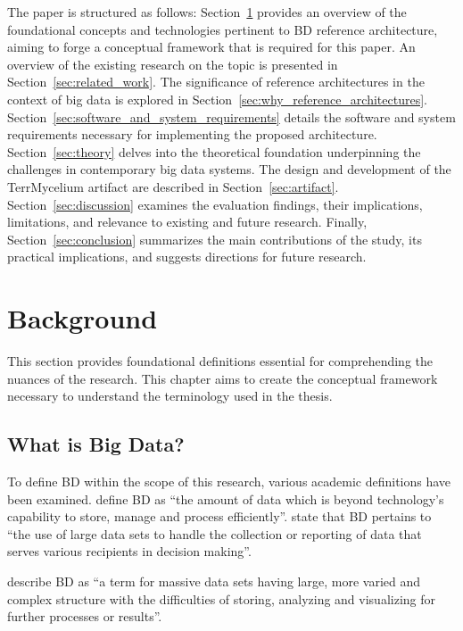 \documentclass[preprint,12pt]{elsarticle}
\begin{document}
The paper is structured as follows: Section~\ref{sec:background} provides an overview of the foundational concepts and technologies pertinent to BD reference architecture, aiming to forge a conceptual framework that is required for this paper. An overview of the existing research on the topic is presented in Section~\ref{sec:related_work}. The significance of reference architectures in the context of big data is explored in Section~\ref{sec:why_reference_architectures}. Section~\ref{sec:software_and_system_requirements} details the software and system requirements necessary for implementing the proposed architecture. Section~\ref{sec:theory} delves into the theoretical foundation underpinning the challenges in contemporary big data systems. The design and development of the TerrMycelium artifact are described in Section~\ref{sec:artifact}. Section~\ref{sec:discussion} examines the evaluation findings, their implications, limitations, and relevance to existing and future research. Finally, Section~\ref{sec:conclusion} summarizes the main contributions of the study, its practical implications, and suggests directions for future research.


\section{Background}
\label{sec:background}

This section provides foundational definitions essential for comprehending the nuances of the research. This chapter aims to create the conceptual framework necessary to understand the terminology used in the thesis.

\subsection{What is Big Data?}

To define BD within the scope of this research, various academic definitions have been examined. \citet{Kaisler2013} define BD as ``the amount of data which is beyond technology’s capability to store, manage and process efficiently''.
\citet{Srivastava2018} state that BD pertains to ``the use of large data sets to handle the collection or reporting of data that serves various recipients in decision making''.

\citet{Sagiroglu2013} describe BD as ``a term for massive data sets having large, more varied and complex structure with the difficulties of storing, analyzing and visualizing for further processes or results''. 
\end{document}
